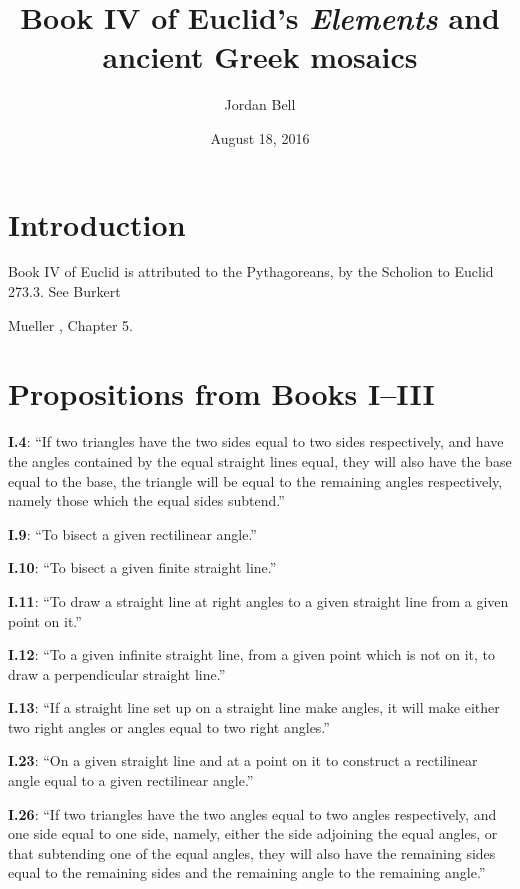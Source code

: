 \documentclass{article}
\begin{document}
\title{Book IV of Euclid's {\em Elements} and ancient Greek mosaics}
\author{Jordan Bell}
\date{August 18, 2016}

\maketitle

\section{Introduction}
Book IV of Euclid is attributed to the Pythagoreans, by the Scholion to Euclid 273.3. See Burkert \cite[p.~450]{burkert}

Mueller \cite{mueller}, Chapter 5.






\section{Propositions from Books I--III}
\textbf{I.4}: ``If two triangles have the two sides equal to two sides
respectively, and have the angles contained by the equal straight
lines equal, they will also have the base equal to the base, the
triangle will be equal to the remaining angles respectively, namely those
which the equal sides subtend.''

\textbf{I.9}: ``To bisect a given rectilinear angle.''

\textbf{I.10}: ``To bisect a given finite straight line.''

\textbf{I.11}: ``To draw a straight line at right angles to a given straight
line from a given point on it.''

\textbf{I.12}: ``To a given infinite straight line, from a given point
which is not on it, to draw a perpendicular straight line.''

\textbf{I.13}: ``If a straight line set up on a straight line make angles, it
will make either two right angles or angles equal to two right
angles.''

\textbf{I.23}: ``On a given straight line and at a point on it to construct a
rectilinear angle equal to a given rectilinear angle.''

\textbf{I.26}: ``If two triangles have the two angles equal to two angles
respectively, and one side equal to one side, namely, either the 
side adjoining the equal angles, or that subtending one of the
equal angles, they will also have the remaining sides equal to
the remaining sides and the remaining angle to the remaining
angle.''
\end{document}
